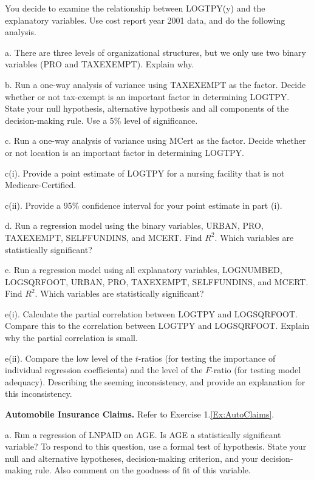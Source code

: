 \begin{exercises}
You decide to examine the relationship between LOGTPY(y) and the
explanatory variables. Use cost report year 2001 data, and do the
following analysis.

a. There are three levels of organizational structures, but we only
use two binary variables (PRO and TAXEXEMPT). Explain why.

b. Run a one-way analysis of variance using TAXEXEMPT as the factor.
Decide whether or not tax-exempt is an important factor in
determining LOGTPY. State your null hypothesis, alternative
hypothesis and all components of the decision-making rule. Use a 5\%
level of significance.

c. Run a one-way analysis of variance using MCert as the factor.
Decide whether or not location is an important factor in determining
LOGTPY.

c(i). Provide a point estimate of LOGTPY for a nursing facility that
is not Medicare-Certified.

c(ii).  Provide a 95\% confidence interval for your point estimate
in part (i).

d. Run a regression model using the binary variables, URBAN, PRO,
TAXEXEMPT, SELFFUNDINS, and MCERT. Find $R^2$. Which variables are
statistically significant?

e. Run a regression model using all explanatory variables,
LOGNUMBED, LOGSQRFOOT, URBAN, PRO, TAXEXEMPT, SELFFUNDINS, and
MCERT. Find $R^2$. Which variables are statistically significant?

e(i). Calculate the partial correlation between LOGTPY and
LOGSQRFOOT. Compare this to the correlation between LOGTPY and
LOGSQRFOOT. Explain why the partial correlation is small.

e(ii). Compare the low level of the $t$-ratios (for testing the
importance of individual regression coefficients) and the level of
the $F$-ratio (for testing model adequacy). Describing the seeming
inconsistency, and provide an explanation for this inconsistency.


\item \textbf{Automobile Insurance Claims.}\label{Ex:AutoClaims4} Refer to Exercise
1.\ref{Ex:AutoClaims}.

a. Run a regression of LNPAID on AGE. Is AGE a statistically
significant variable? To respond to this question, use a formal test
of hypothesis. State your null and alternative hypotheses,
decision-making criterion, and your decision-making rule. Also
comment on the goodness of fit of this variable.


\end{exercises}
